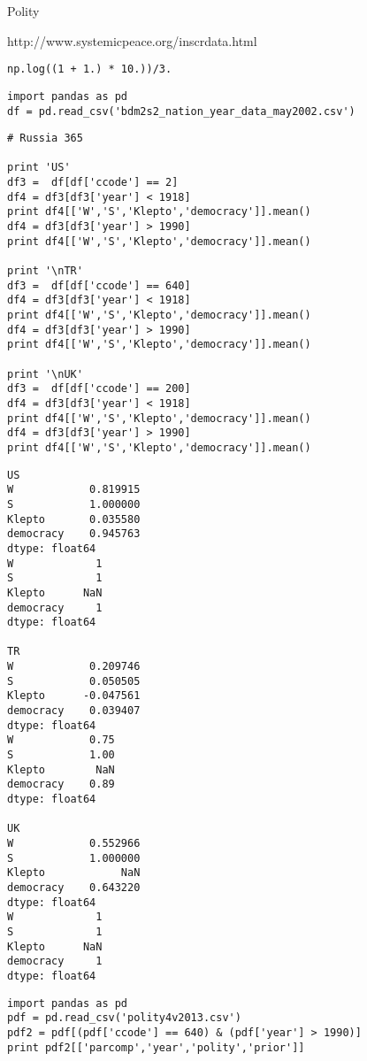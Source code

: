 \documentclass[12pt,fleqn]{article}\usepackage{common}
\begin{document}
Polity

http://www.systemicpeace.org/inscrdata.html

\begin{verbatim}
np.log((1 + 1.) * 10.))/3.
\end{verbatim}


\begin{verbatim}
import pandas as pd
df = pd.read_csv('bdm2s2_nation_year_data_may2002.csv')
\end{verbatim}


\begin{verbatim}
# Russia 365

print 'US'
df3 =  df[df['ccode'] == 2]
df4 = df3[df3['year'] < 1918]
print df4[['W','S','Klepto','democracy']].mean()
df4 = df3[df3['year'] > 1990]
print df4[['W','S','Klepto','democracy']].mean()

print '\nTR'
df3 =  df[df['ccode'] == 640]
df4 = df3[df3['year'] < 1918]
print df4[['W','S','Klepto','democracy']].mean()
df4 = df3[df3['year'] > 1990]
print df4[['W','S','Klepto','democracy']].mean()

print '\nUK'
df3 =  df[df['ccode'] == 200]
df4 = df3[df3['year'] < 1918]
print df4[['W','S','Klepto','democracy']].mean()
df4 = df3[df3['year'] > 1990]
print df4[['W','S','Klepto','democracy']].mean()
\end{verbatim}

\begin{verbatim}
US
W            0.819915
S            1.000000
Klepto       0.035580
democracy    0.945763
dtype: float64
W             1
S             1
Klepto      NaN
democracy     1
dtype: float64

TR
W            0.209746
S            0.050505
Klepto      -0.047561
democracy    0.039407
dtype: float64
W            0.75
S            1.00
Klepto        NaN
democracy    0.89
dtype: float64

UK
W            0.552966
S            1.000000
Klepto            NaN
democracy    0.643220
dtype: float64
W             1
S             1
Klepto      NaN
democracy     1
dtype: float64
\end{verbatim}

\begin{verbatim}
import pandas as pd
pdf = pd.read_csv('polity4v2013.csv')
pdf2 = pdf[(pdf['ccode'] == 640) & (pdf['year'] > 1990)]
print pdf2[['parcomp','year','polity','prior']]
\end{verbatim}
\end{document}
